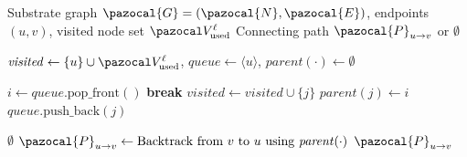\documentclass[a4paper,fleqn]{cas-sc}
\begin{document}
\begin{algorithm}[htbp]
\small
\caption{Feasibility-Oriented Path Completion for Line Repair}
\label{alg:bfs_repair}
\begin{algorithmic}[1]
    \renewcommand{\algorithmicrequire}{\textbf{Input:}}
    \renewcommand{\algorithmicensure}{\textbf{Output:}}
    
    \REQUIRE Substrate graph $\pazocal{G}=(\pazocal{N}, \pazocal{E})$, endpoints $(u, v)$, visited node set $\pazocal V_{\mathrm{used}}^\ell$
    \ENSURE Connecting path $\pazocal{P}_{u \to v}$ or $\emptyset$
    
    \STATE $\mathit{visited} \gets \{u\} \cup \pazocal V_{\mathrm{used}}^\ell$, $\mathit{queue} \gets \langle u \rangle$, $\mathit{parent}(\cdot) \gets \emptyset$
    
        \STATE $i \gets \mathit{queue}.\text{pop\_front}()$
            \STATE \textbf{break}
        \ENDIF
                \STATE $\mathit{visited} \gets \mathit{visited} \cup \{j\}$
                \STATE $\mathit{parent}(j) \gets i$
                \STATE $\mathit{queue}.\text{push\_back}(j)$
            \ENDIF
        \ENDFOR
    \ENDWHILE
    
        \RETURN $\emptyset$
    \ENDIF
    \STATE $\pazocal{P}_{u \to v} \gets \text{Backtrack from } v \text{ to } u \text{ using } \mathit{parent}(\cdot)$
    \RETURN $\pazocal{P}_{u \to v}$
\end{algorithmic}
\end{algorithm}
\end{document}
